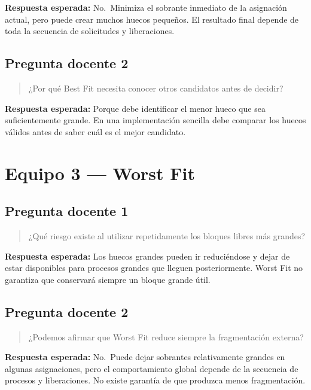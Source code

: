 \documentclass[
  spanish,
  letterpaper,
]{scrbook}
\begin{document}
\textbf{Respuesta esperada:} No.~Minimiza el sobrante inmediato de la
asignación actual, pero puede crear muchos huecos pequeños. El resultado
final depende de toda la secuencia de solicitudes y liberaciones.

\subsection{Pregunta docente 2}\label{pregunta-docente-2-1}

\begin{quote}
¿Por qué Best Fit necesita conocer otros candidatos antes de decidir?
\end{quote}

\textbf{Respuesta esperada:} Porque debe identificar el menor hueco que
sea suficientemente grande. En una implementación sencilla debe comparar
los huecos válidos antes de saber cuál es el mejor candidato.

\section{Equipo 3 --- Worst Fit}\label{equipo-3-worst-fit-1}

\subsection{Pregunta docente 1}\label{pregunta-docente-1-2}

\begin{quote}
¿Qué riesgo existe al utilizar repetidamente los bloques libres más
grandes?
\end{quote}

\textbf{Respuesta esperada:} Los huecos grandes pueden ir reduciéndose y
dejar de estar disponibles para procesos grandes que lleguen
posteriormente. Worst Fit no garantiza que conservará siempre un bloque
grande útil.

\subsection{Pregunta docente 2}\label{pregunta-docente-2-2}

\begin{quote}
¿Podemos afirmar que Worst Fit reduce siempre la fragmentación externa?
\end{quote}

\textbf{Respuesta esperada:} No.~Puede dejar sobrantes relativamente
grandes en algunas asignaciones, pero el comportamiento global depende
de la secuencia de procesos y liberaciones. No existe garantía de que
produzca menos fragmentación.
\end{document}
